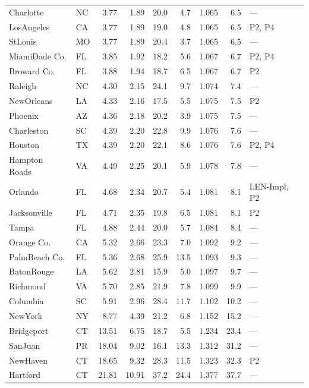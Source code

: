 \documentclass[11pt]{article}
\begin{document}
\begin{longtable}{@{}llrrrrrrl@{}}
Charlotte & NC & 3.77 & 1.89 & 20.0 & 4.7 & 1.065 & 6.5 & --- \\
LosAngeles & CA & 3.77 & 1.89 & 19.0 & 4.8 & 1.065 & 6.5 & P2, P4 \\
StLouis & MO & 3.77 & 1.89 & 20.4 & 3.7 & 1.065 & 6.5 & --- \\
MiamiDade Co. & FL & 3.85 & 1.92 & 18.2 & 5.6 & 1.067 & 6.7 & P2, P4 \\
Broward Co. & FL & 3.88 & 1.94 & 18.7 & 6.5 & 1.067 & 6.7 & P2 \\
Raleigh & NC & 4.30 & 2.15 & 24.1 & 9.7 & 1.074 & 7.4 & --- \\
NewOrleans & LA & 4.33 & 2.16 & 17.5 & 5.5 & 1.075 & 7.5 & P2 \\
Phoenix & AZ & 4.36 & 2.18 & 20.2 & 3.9 & 1.075 & 7.5 & --- \\
Charleston & SC & 4.39 & 2.20 & 22.8 & 9.9 & 1.076 & 7.6 & --- \\
Houston & TX & 4.39 & 2.20 & 22.1 & 8.6 & 1.076 & 7.6 & P2, P4 \\
Hampton Roads & VA & 4.49 & 2.25 & 20.1 & 5.9 & 1.078 & 7.8 & --- \\
Orlando & FL & 4.68 & 2.34 & 20.7 & 5.4 & 1.081 & 8.1 & LEN-Impl, P2 \\
Jacksonville & FL & 4.71 & 2.35 & 19.8 & 6.5 & 1.081 & 8.1 & P2 \\
Tampa & FL & 4.88 & 2.44 & 20.0 & 5.7 & 1.084 & 8.4 & --- \\
Orange Co. & CA & 5.32 & 2.66 & 23.3 & 7.0 & 1.092 & 9.2 & --- \\
PalmBeach Co. & FL & 5.36 & 2.68 & 25.9 & 13.5 & 1.093 & 9.3 & --- \\
BatonRouge & LA & 5.62 & 2.81 & 15.9 & 5.0 & 1.097 & 9.7 & --- \\
Richmond & VA & 5.70 & 2.85 & 21.9 & 7.8 & 1.099 & 9.9 & --- \\
Columbia & SC & 5.91 & 2.96 & 28.4 & 11.7 & 1.102 & 10.2 & --- \\
NewYork & NY & 8.77 & 4.39 & 21.2 & 6.8 & 1.152 & 15.2 & --- \\
Bridgeport & CT & 13.51 & 6.75 & 18.7 & 5.5 & 1.234 & 23.4 & --- \\
SanJuan & PR & 18.04 & 9.02 & 16.1 & 13.3 & 1.312 & 31.2 & --- \\
NewHaven & CT & 18.65 & 9.32 & 28.3 & 11.5 & 1.323 & 32.3 & P2 \\
Hartford & CT & 21.81 & 10.91 & 37.2 & 24.4 & 1.377 & 37.7 & --- \\
\end{longtable}
\normalsize
\setlength{\tabcolsep}{6pt}
\renewcommand{\arraystretch}{1.0}
\end{document}

